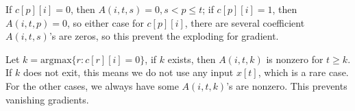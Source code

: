 \documentclass[10pt,a4paper]{article}
\theoremstyle{dotlessP}
\begin{document}
\begin{enumerate}[(a)]
	If $c[p][i]=0$, then $A(i,t,s)=0, s<p\leq t$; if $c[p][i]=1$, then $A(i,t,p)=0$, so either case for $c[p][i]$, there are several coefficient $A(i,t,s)$'s are zeros, so this prevent the exploding for gradient.
	
	Let $k=\text{argmax}\{r: c[r][i] = 0\}$, if $k$ exists, then $A(i,t ,k)$ is nonzero for $t\geq k$. If $k$ does not exit, this means we do not use any input $x[t]$, which is a rare case. For the other cases, we always have some $A(i,t ,k)$'s are nonzero. This prevents vanishing gradients.
\end{enumerate}
\end{document}
